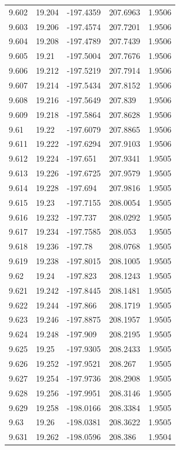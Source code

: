 \begin{tabular}{lllll}
9.602 & 19.204 & -197.4359 & 207.6963 & 1.9506 \\
9.603 & 19.206 & -197.4574 & 207.7201 & 1.9506 \\
9.604 & 19.208 & -197.4789 & 207.7439 & 1.9506 \\
9.605 & 19.21 & -197.5004 & 207.7676 & 1.9506 \\
9.606 & 19.212 & -197.5219 & 207.7914 & 1.9506 \\
9.607 & 19.214 & -197.5434 & 207.8152 & 1.9506 \\
9.608 & 19.216 & -197.5649 & 207.839 & 1.9506 \\
9.609 & 19.218 & -197.5864 & 207.8628 & 1.9506 \\
9.61 & 19.22 & -197.6079 & 207.8865 & 1.9506 \\
9.611 & 19.222 & -197.6294 & 207.9103 & 1.9506 \\
9.612 & 19.224 & -197.651 & 207.9341 & 1.9505 \\
9.613 & 19.226 & -197.6725 & 207.9579 & 1.9505 \\
9.614 & 19.228 & -197.694 & 207.9816 & 1.9505 \\
9.615 & 19.23 & -197.7155 & 208.0054 & 1.9505 \\
9.616 & 19.232 & -197.737 & 208.0292 & 1.9505 \\
9.617 & 19.234 & -197.7585 & 208.053 & 1.9505 \\
9.618 & 19.236 & -197.78 & 208.0768 & 1.9505 \\
9.619 & 19.238 & -197.8015 & 208.1005 & 1.9505 \\
9.62 & 19.24 & -197.823 & 208.1243 & 1.9505 \\
9.621 & 19.242 & -197.8445 & 208.1481 & 1.9505 \\
9.622 & 19.244 & -197.866 & 208.1719 & 1.9505 \\
9.623 & 19.246 & -197.8875 & 208.1957 & 1.9505 \\
9.624 & 19.248 & -197.909 & 208.2195 & 1.9505 \\
9.625 & 19.25 & -197.9305 & 208.2433 & 1.9505 \\
9.626 & 19.252 & -197.9521 & 208.267 & 1.9505 \\
9.627 & 19.254 & -197.9736 & 208.2908 & 1.9505 \\
9.628 & 19.256 & -197.9951 & 208.3146 & 1.9505 \\
9.629 & 19.258 & -198.0166 & 208.3384 & 1.9505 \\
9.63 & 19.26 & -198.0381 & 208.3622 & 1.9505 \\
9.631 & 19.262 & -198.0596 & 208.386 & 1.9504 \\

\end{tabular}
